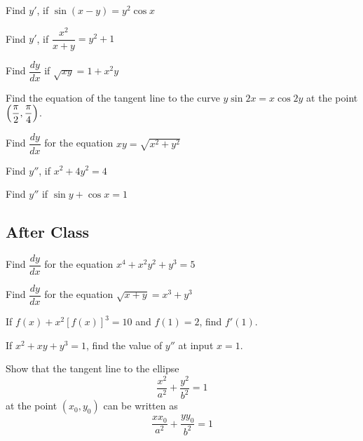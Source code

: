 \documentclass[notes]{subfiles}
\begin{document}
		\begin{ex}
			Find $y'$, if $\sin (x-y) = y^2\cos x$
		\end{ex}
			
		\begin{ex}
			Find $y'$, if $\dfrac{x^2}{x+y} = y^2 + 1$
		\end{ex}
			\newpage
			
		\begin{ex}
			Find $\dfrac{dy}{dx}$ if $\sqrt{xy} = 1 + x^2y$
		\end{ex}
			
		\begin{ex}
			Find the equation of the tangent line to the curve $y\sin 2x = x\cos 2y$ at the point $\left( \dfrac{\pi}{2},\dfrac{\pi}{4}\right)$.
		\end{ex}

		\begin{ex}
			Find $\dfrac{dy}{dx}$ for the equation $xy = \sqrt{x^2+y^2}$
		\end{ex}
			\newpage
			
		\begin{ex}
			Find $y''$, if $x^2 + 4y^2 = 4$
		\end{ex}
			
		\begin{ex}
			Find $y''$ if $\sin y + \cos x = 1$
		\end{ex}
			\newpage
			
	\subsection*{After Class}	
		\begin{ex}
			Find $\dfrac{dy}{dx}$ for the equation $x^4 + x^2y^2 + y^3 = 5$
		\end{ex}	
			
		\begin{ex}
			Find $\dfrac{dy}{dx}$ for the equation $\sqrt{x+y} = x^3 + y^3$
		\end{ex}	
			\newpage
			
		\begin{ex}
			If $f(x) + x^2[f(x)]^3 = 10$ and $f(1) = 2$, find $f'(1)$.
		\end{ex}
			
		\begin{ex}
			If $x^2 + xy + y^3 = 1$, find the value of $y''$ at input $x = 1$.
		\end{ex}
			\newpage
			
		\begin{ex}
			Show that the tangent line to the ellipse 
				\[\dfrac{x^2}{a^2} + \dfrac{y^2}{b^2} = 1\]
			at the point $(x_0,y_0)$ can be written as
				\[\dfrac{xx_0}{a^2} + \dfrac{yy_0}{b^2} = 1\]
		\end{ex}

	\clearpage
\end{document}
